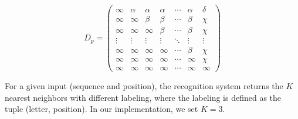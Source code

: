 \documentclass[10pt, conference, compsocconf]{IEEEtran}
\begin{document}
\begin{equation}
D_{p}=
\left( 
\begin{array}{ccccccc}
\infty 	& \alpha & \alpha & \alpha  & \cdots & \alpha & \delta \\
\infty  & \infty  & \beta   & \beta   & \cdots  & \beta  & \chi    \\
\infty  & \infty  & \infty   & \beta   & \cdots  & \beta  & \chi    \\
\vdots & \vdots & \vdots  & \vdots & \ddots  & \vdots & \vdots \\
\infty  & \infty  & \infty   & \infty   & \cdots  & \beta  & \chi    \\
\infty  & \infty  & \infty   & \infty   & \cdots  & \infty  & \chi    \\
\infty  & \infty  & \infty   & \infty   & \cdots  & \infty  & \infty \end{array} \right)
\label{eq:positions_matrix}
\end{equation}

For a given input (sequence and position), the recognition system returns the $K$ nearest neighbors with different labeling, where the labeling is defined as the tuple (letter, position). In our implementation, we set $K=3$.\\
\end{document}

